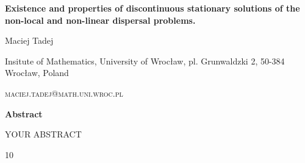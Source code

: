 \documentclass[a4paper, 10pt]{article}
\begin{document}
\begin{center}
{\bf Existence and properties of discontinuous stationary solutions of the non-local and non-linear dispersal problems.}
\end{center}


\centerline{Maciej Tadej}

\vspace{12pt}

\centerline{Insitute of Mathematics, University of Wrocław, pl. Grunwaldzki 2, 50-384 Wrocław, Poland}
\centerline{\textsc{ maciej.tadej@math.uni.wroc.pl }}

\vspace{12pt}
\parindent=1cm

\centerline{{\bf Abstract}}

\vspace{12pt}

\noindent

YOUR ABSTRACT

\begin{thebibliography}{10}


\end{thebibliography}
\end{document}
